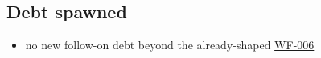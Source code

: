 \subsection{Debt spawned}\label{record-203-debt-spawned}

\begin{itemize}
\tightlist
\item
  no new follow-on debt beyond the already-shaped \href{https://github.com/flyingrobots/bijou/blob/cbd70612140e7a450d764b3c7be1c6af878b99bc/docs/design/WF-006-cut-clean-4-1-0-release-boundary.md}{WF-006}
\end{itemize}

